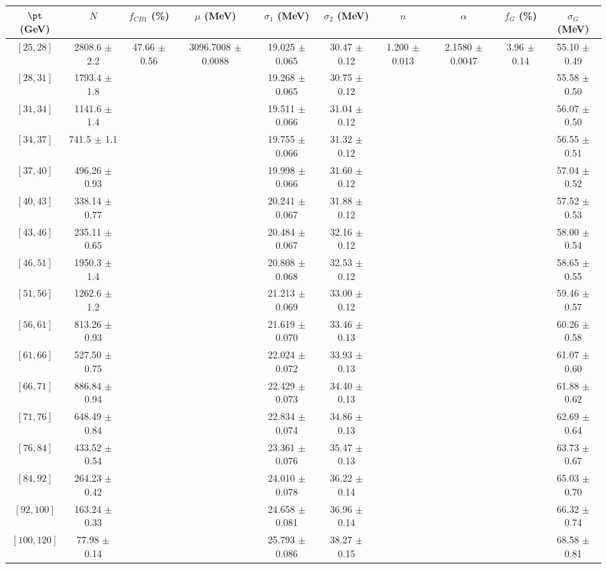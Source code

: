 \begin{tabular}{c||c|c|c|c|c|c|c|c|c}
$\pt$ (GeV) & $N$ & $f_{CB1}$ (\%)  & $\mu$ (MeV) & $\sigma_1$ (MeV) & $\sigma_2$ (MeV) & $n$ & $\alpha$ & $f_G$ (\%) & $\sigma_G$ (MeV) \\
\hline
$[25, 28]$ & 2808.6 $\pm$ 2.2 & \multirow{17}{*}{47.66 $\pm$ 0.56} & \multirow{17}{*}{3096.7008 $\pm$ 0.0088} & 19.025 $\pm$ 0.065 & 30.47 $\pm$ 0.12 & \multirow{17}{*}{1.200 $\pm$ 0.013} & \multirow{17}{*}{2.1580 $\pm$ 0.0047} & \multirow{17}{*}{3.96 $\pm$ 0.14} & 55.10 $\pm$ 0.49\\
$[28, 31]$ & 1793.4 $\pm$ 1.8 &  &  & 19.268 $\pm$ 0.065 & 30.75 $\pm$ 0.12 &  &  &  & 55.58 $\pm$ 0.50\\
$[31, 34]$ & 1141.6 $\pm$ 1.4 &  &  & 19.511 $\pm$ 0.066 & 31.04 $\pm$ 0.12 &  &  &  & 56.07 $\pm$ 0.50\\
$[34, 37]$ & 741.5 $\pm$ 1.1 &  &  & 19.755 $\pm$ 0.066 & 31.32 $\pm$ 0.12 &  &  &  & 56.55 $\pm$ 0.51\\
$[37, 40]$ & 496.26 $\pm$ 0.93 &  &  & 19.998 $\pm$ 0.066 & 31.60 $\pm$ 0.12 &  &  &  & 57.04 $\pm$ 0.52\\
$[40, 43]$ & 338.14 $\pm$ 0.77 &  &  & 20.241 $\pm$ 0.067 & 31.88 $\pm$ 0.12 &  &  &  & 57.52 $\pm$ 0.53\\
$[43, 46]$ & 235.11 $\pm$ 0.65 &  &  & 20.484 $\pm$ 0.067 & 32.16 $\pm$ 0.12 &  &  &  & 58.00 $\pm$ 0.54\\
$[46, 51]$ & 1950.3 $\pm$ 1.4 &  &  & 20.808 $\pm$ 0.068 & 32.53 $\pm$ 0.12 &  &  &  & 58.65 $\pm$ 0.55\\
$[51, 56]$ & 1262.6 $\pm$ 1.2 &  &  & 21.213 $\pm$ 0.069 & 33.00 $\pm$ 0.12 &  &  &  & 59.46 $\pm$ 0.57\\
$[56, 61]$ & 813.26 $\pm$ 0.93 &  &  & 21.619 $\pm$ 0.070 & 33.46 $\pm$ 0.13 &  &  &  & 60.26 $\pm$ 0.58\\
$[61, 66]$ & 527.50 $\pm$ 0.75 &  &  & 22.024 $\pm$ 0.072 & 33.93 $\pm$ 0.13 &  &  &  & 61.07 $\pm$ 0.60\\
$[66, 71]$ & 886.84 $\pm$ 0.94 &  &  & 22.429 $\pm$ 0.073 & 34.40 $\pm$ 0.13 &  &  &  & 61.88 $\pm$ 0.62\\
$[71, 76]$ & 648.49 $\pm$ 0.84 &  &  & 22.834 $\pm$ 0.074 & 34.86 $\pm$ 0.13 &  &  &  & 62.69 $\pm$ 0.64\\
$[76, 84]$ & 433.52 $\pm$ 0.54 &  &  & 23.361 $\pm$ 0.076 & 35.47 $\pm$ 0.13 &  &  &  & 63.73 $\pm$ 0.67\\
$[84, 92]$ & 264.23 $\pm$ 0.42 &  &  & 24.010 $\pm$ 0.078 & 36.22 $\pm$ 0.14 &  &  &  & 65.03 $\pm$ 0.70\\
$[92, 100]$ & 163.24 $\pm$ 0.33 &  &  & 24.658 $\pm$ 0.081 & 36.96 $\pm$ 0.14 &  &  &  & 66.32 $\pm$ 0.74\\
$[100, 120]$ & 77.98 $\pm$ 0.14 &  &  & 25.793 $\pm$ 0.086 & 38.27 $\pm$ 0.15 &  &  &  & 68.58 $\pm$ 0.81\\
\end{tabular}
